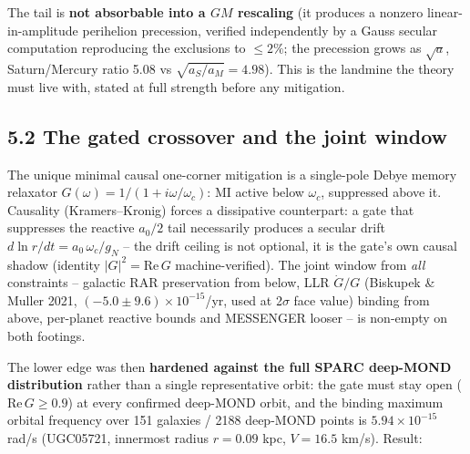 \documentclass[
]{article}
\begin{document}
The tail is \textbf{not absorbable into a \(GM\) rescaling} (it produces
a nonzero linear-in-amplitude perihelion precession, verified
independently by a Gauss secular computation reproducing the exclusions
to \(\le 2\%\); the precession grows as \(\sqrt{a}\), Saturn/Mercury
ratio 5.08 vs \(\sqrt{a_S/a_M} = 4.98\)). This is the landmine the
theory must live with, stated at full strength before any mitigation.

\subsection{5.2 The gated crossover and the joint
window}\label{the-gated-crossover-and-the-joint-window}

The unique minimal causal one-corner mitigation is a single-pole Debye
memory relaxator \(G(\omega) = 1/(1 + i\omega/\omega_c)\): MI active
below \(\omega_c\), suppressed above it. Causality (Kramers--Kronig)
forces a dissipative counterpart: a gate that suppresses the reactive
\(a_0/2\) tail necessarily produces a secular drift
\(d\ln r/dt = a_0\,\omega_c/g_N\) -- the drift ceiling is not optional,
it is the gate's own causal shadow (identity \(|G|^2 = \mathrm{Re}\, G\)
machine-verified). The joint window from \emph{all} constraints --
galactic RAR preservation from below, LLR \(\dot G/G\) (Biskupek \&
Muller 2021, \((-5.0 \pm 9.6)\times 10^{-15}\)/yr, used at 2\(\sigma\)
face value) binding from above, per-planet reactive bounds and MESSENGER
looser -- is non-empty on both footings.

The lower edge was then \textbf{hardened against the full SPARC
deep-MOND distribution} rather than a single representative orbit: the
gate must stay open (\(\mathrm{Re}\,G \ge 0.9\)) at every confirmed
deep-MOND orbit, and the binding maximum orbital frequency over 151
galaxies / 2188 deep-MOND points is \(5.94 \times 10^{-15}\) rad/s
(UGC05721, innermost radius \(r = 0.09\) kpc, \(V = 16.5\) km/s).
Result:
\end{document}
